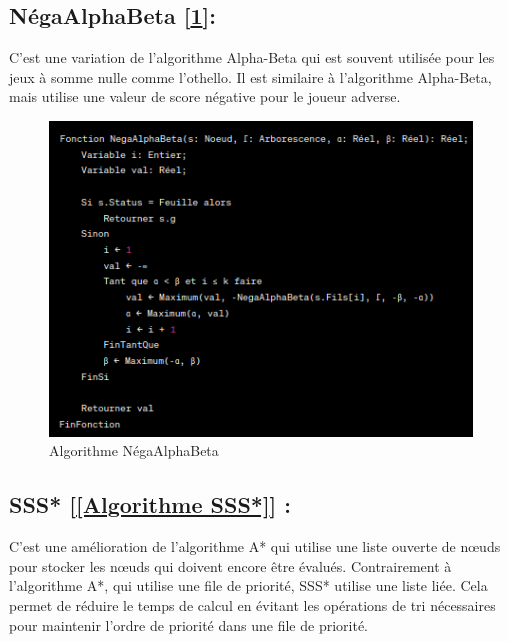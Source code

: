 \documentclass[12pt]{article}
\begin{document}
	
		
\subsection{NégaAlphaBeta [\ref{Algorithme NégaAlphaBeta}]: }C'est une variation de l'algorithme Alpha-Beta qui est souvent utilisée pour les jeux à somme nulle comme l'othello. Il est similaire à l'algorithme Alpha-Beta, mais utilise une valeur de score négative pour le joueur adverse.
	
	
		   
	\begin{figure}[H]
		\centering
		\includegraphics[scale=0.7]{img/negaalphabeta}
		\caption{Algorithme NégaAlphaBeta }
		\label{Algorithme NégaAlphaBeta}
	\end{figure}
	
	\subsection{SSS* [\ref{Algorithme SSS*}] :} C'est une amélioration de l'algorithme A* qui utilise une liste ouverte de nœuds pour stocker les nœuds qui doivent encore être évalués. Contrairement à l'algorithme A*, qui utilise une file de priorité, SSS* utilise une liste liée. Cela permet de réduire le temps de calcul en évitant les opérations de tri nécessaires pour maintenir l'ordre de priorité dans une file de priorité.
	
\end{document}
